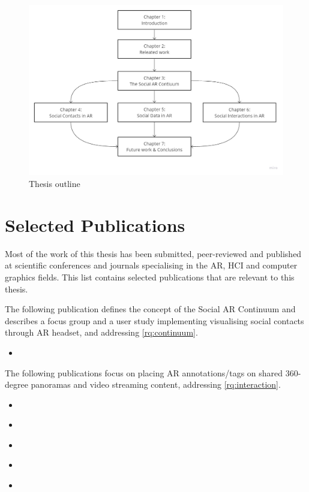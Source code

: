 \begin{figure}
    \centering
    \includegraphics[width=\linewidth]{images/intro/thesis-outline.jpg}
    \caption{Thesis outline}
    \label{fig:thesis-outline}
\end{figure}

\section{Selected Publications}
\preto{}

Most of the work of this thesis has been submitted, peer-reviewed and published at scientific conferences and journals specialising in the AR, HCI and computer graphics fields. This list contains selected publications that are relevant to this thesis. 

The following publication defines the concept of the Social AR Continuum and describes a focus group and a user study implementing visualising social contacts through AR headset, and addressing \ref{rq:continuum}. 

\begin{itemize}
    \item{ }
\end{itemize}

The following publications focus on placing AR annotations/tags on shared 360-degree panoramas and video streaming content, addressing \ref{rq:interaction}.

\begin{itemize}
    \item{ }
    \item{ }
    \item{ }    
    \item{ }
    \item{ }
\end{itemize}


